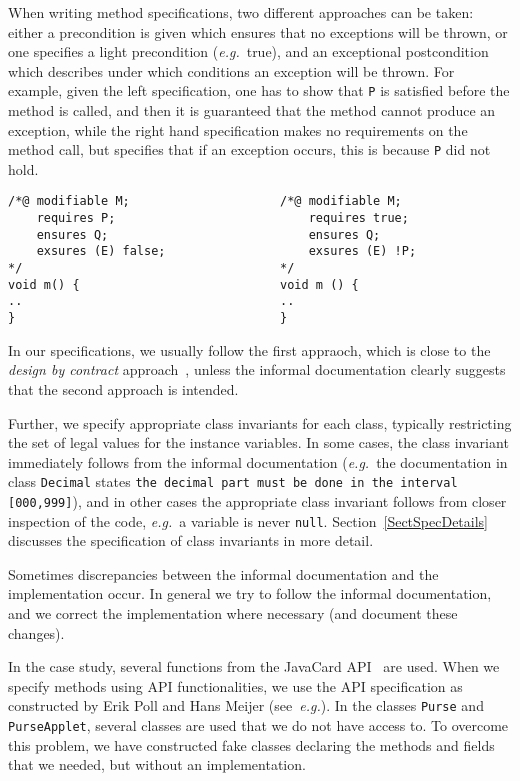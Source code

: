 \documentclass[a4paper]{llncs}
\begin{document}
When writing method specifications, two different approaches can be
taken: either a precondition is given which ensures that no exceptions
will be thrown, or one specifies a light precondition
(\emph{e.g.}~true), and an exceptional postcondition which describes
under which conditions an exception will be thrown. For example, given
the left specification, one has to show that \texttt{P} is satisfied
before the method is called, and then it is guaranteed that the method
cannot produce an exception, while the right hand specification makes
no requirements on the method call, but specifies that if an exception
occurs, this is because \texttt{P} did not hold.
\begin{verbatim}
/*@ modifiable M;                     /*@ modifiable M;
    requires P;                           requires true;
    ensures Q;                            ensures Q;
    exsures (E) false;                    exsures (E) !P;
*/                                    */
void m() {                            void m () {
..                                    ..
}                                     }
\end{verbatim}

In our specifications, we usually follow the first appraoch, which
is close to the \emph{design by contract} approach~\cite{Meyer97},
unless the informal documentation clearly suggests that the second
approach is intended.

Further, we specify appropriate class invariants for each class,
typically restricting the set of legal values for the instance
variables. In some cases, the class invariant immediately follows from
the informal documentation (\emph{e.g.}~the documentation in class
\texttt{Decimal} states
\texttt{the decimal part must be done in the interval [000,999]}), and
in other cases the appropriate class invariant follows from closer
inspection of the code, \emph{e.g.}~a variable is never \texttt{null}.
Section~\ref{SectSpecDetails} discusses the specification of class
invariants in more detail.

Sometimes discrepancies between the informal documentation and the
implementation occur. In general we try to follow the informal
documentation, and we correct the implementation where necessary
(and document these changes). 

In the case study, several functions from the JavaCard
API~\cite{JavaCardAPI} are used. When we specify methods using API
functionalities, we use the API specification as constructed by Erik
Poll and Hans Meijer (see~\emph{e.g.}\cite{MeijerP01}).  In the
classes \texttt{Purse} and \texttt{PurseApplet}, several classes are
used that we do not have access to. To overcome this problem, we have
constructed fake classes declaring the methods and fields that we
needed, but without an implementation.
\end{document}
